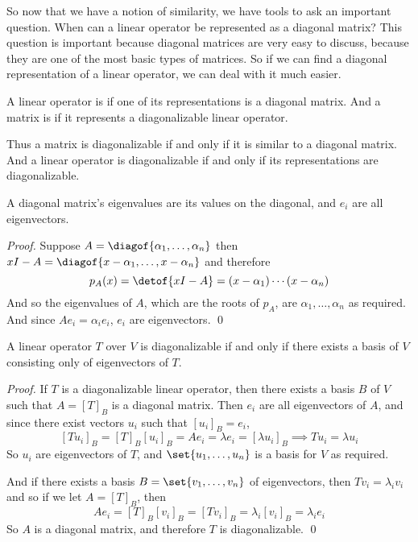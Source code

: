 So now that we have a notion of similarity, we have tools to ask an important question.
When can a linear operator be represented as a diagonal matrix?
This question is important because diagonal matrices are very easy to discuss, because they are one of the most basic types of matrices.
So if we can find a diagonal representation of a linear operator, we can deal with it much easier.

\begin{defn*}

    A linear operator is  if one of its representations is a diagonal matrix.
    And a matrix is  if it represents a diagonalizable linear operator.

\end{defn*}

Thus a matrix is diagonalizable if and only if it is similar to a diagonal matrix.
And a linear operator is diagonalizable if and only if its representations are diagonalizable.

\begin{lemm*}

    A diagonal matrix's eigenvalues are its values on the diagonal, and $e_i$ are all eigenvectors.

\end{lemm*}

\begin{proof}

    Suppose $A=\diagof{\alpha_1,\dots,\alpha_n}$ then $xI-A=\diagof{x-\alpha_1,\dots,x-\alpha_n}$ and therefore
    \[ p_A(x) = \detof{xI-A} = (x-\alpha_1)\cdots(x-\alpha_n) \]
    And so the eigenvalues of $A$, which are the roots of $p_A$, are $\alpha_1,\dots,\alpha_n$ as required.
    And since $Ae_i=\alpha_i e_i$, $e_i$ are eigenvectors.
    \qed

\end{proof}

\begin{thrm*}

    A linear operator $T$ over $V$ is diagonalizable if and only if there exists a basis of $V$ consisting only of eigenvectors of $T$.

\end{thrm*}

\begin{proof}

    If $T$ is a diagonalizable linear operator, then there exists a basis $B$ of $V$ such that $A=[T]_B$ is a diagonal matrix.
    Then $e_i$ are all eigenvectors of $A$, and since there exist vectors $u_i$ such that $[u_i]_B=e_i$,
    \[ [Tu_i]_B = [T]_B[u_i]_B = Ae_i = \lambda e_i = [\lambda u_i]_B \implies Tu_i=\lambda u_i \]
    So $u_i$ are eigenvectors of $T$, and $\set{u_1,\dots,u_n}$ is a basis for $V$ as required.

    And if there exists a basis $B=\set{v_1,\dots,v_n}$ of eigenvectors, then $Tv_i=\lambda_iv_i$ and so if we let $A=[T]_B$, then
    \[ Ae_i = [T]_B[v_i]_B = [Tv_i]_B = \lambda_i[v_i]_B = \lambda_ie_i \]
    So $A$ is a diagonal matrix, and therefore $T$ is diagonalizable.
    \qed

\end{proof}

